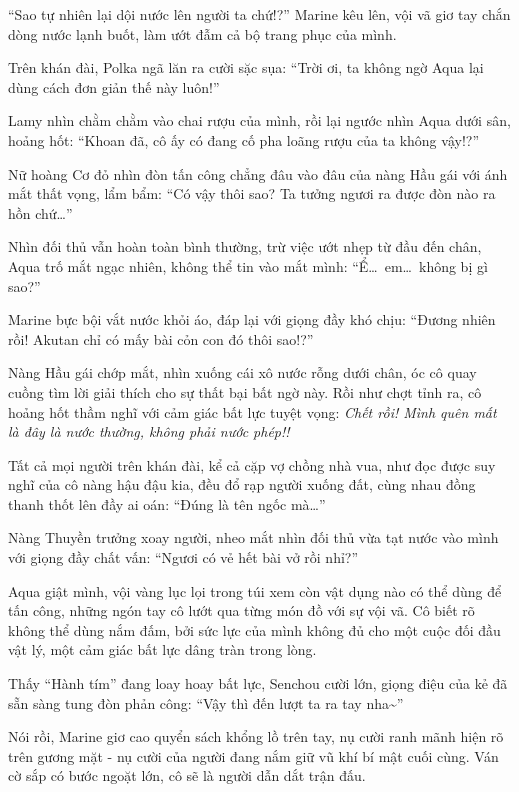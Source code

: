 \documentclass[../main.tex]{subfiles}
\begin{document}
``Sao tự nhiên lại dội nước lên người ta chứ!?'' Marine kêu lên, vội vã giơ tay chắn dòng nước lạnh buốt, làm ướt đẫm cả bộ trang phục của mình.

Trên khán đài, Polka ngã lăn ra cười sặc sụa: ``Trời ơi, ta không ngờ Aqua lại dùng cách đơn giản thế này luôn!''

Lamy nhìn chằm chằm vào chai rượu của mình, rồi lại ngước nhìn Aqua dưới sân, hoảng hốt: ``Khoan đã, cô ấy có đang cố pha loãng rượu của ta không vậy!?''

Nữ hoàng Cơ đỏ nhìn đòn tấn công chẳng đâu vào đâu của nàng Hầu gái với ánh mắt thất vọng, lẩm bẩm: ``Có vậy thôi sao? Ta tưởng ngươi ra được đòn nào ra hồn chứ\dots''

Nhìn đối thủ vẫn hoàn toàn bình thường, trừ việc ướt nhẹp từ đầu đến chân, Aqua trố mắt ngạc nhiên, không thể tin vào mắt mình: ``Ể\dots\ em\dots\ không bị gì sao?''

Marine bực bội vắt nước khỏi áo, đáp lại với giọng đầy khó chịu: ``Đương nhiên rồi! Akutan chỉ có mấy bài cỏn con đó thôi sao!?''

Nàng Hầu gái chớp mắt, nhìn xuống cái xô nước rỗng dưới chân, óc cô quay cuồng tìm lời giải thích cho sự thất bại bất ngờ này. Rồi như chợt tỉnh ra, cô hoảng hốt thầm nghĩ với cảm giác bất lực tuyệt vọng: \textit{Chết rồi! Mình quên mất là đây là nước thường, không phải nước phép!!}

Tất cả mọi người trên khán đài, kể cả cặp vợ chồng nhà vua, như đọc được suy nghĩ của cô nàng hậu đậu kia, đều đổ rạp người xuống đất, cùng nhau đồng thanh thốt lên đầy ai oán: ``Đúng là tên ngốc mà\dots''

Nàng Thuyền trưởng xoay người, nheo mắt nhìn đối thủ vừa tạt nước vào mình với giọng đầy chất vấn: ``Ngươi có vẻ hết bài vở rồi nhỉ?''

Aqua giật mình, vội vàng lục lọi trong túi xem còn vật dụng nào có thể dùng để tấn công, những ngón tay cô lướt qua từng món đồ với sự vội vã. Cô biết rõ không thể dùng nắm đấm, bởi sức lực của mình không đủ cho một cuộc đối đầu vật lý, một cảm giác bất lực dâng tràn trong lòng.

Thấy ``Hành tím'' đang loay hoay bất lực, Senchou cười lớn, giọng điệu của kẻ đã sẵn sàng tung đòn phản công: ``Vậy thì đến lượt ta ra tay nha\~{}''

Nói rồi, Marine giơ cao quyển sách khổng lồ trên tay, nụ cười ranh mãnh hiện rõ trên gương mặt - nụ cười của người đang nắm giữ vũ khí bí mật cuối cùng. Ván cờ sắp có bước ngoặt lớn, cô sẽ là người dẫn dắt trận đấu.
\end{document}
